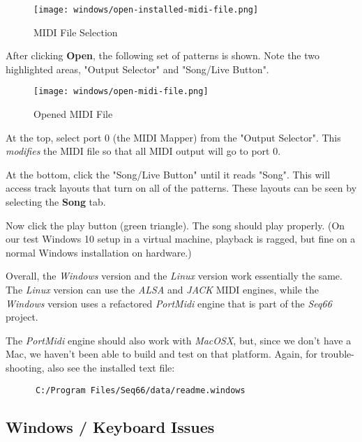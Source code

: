\begin{figure}[H]
   \centering 
   \texttt{[image: windows/open-installed-midi-file.png]}
   \caption{MIDI File Selection}
   \label{fig:windows_open_installed_midi_file}
\end{figure}

   After clicking \textbf{Open}, the following set of patterns is shown.
   Note the two highlighted areas, "Output Selector" and "Song/Live Button".

\begin{figure}[H]
   \centering 
   \texttt{[image: windows/open-midi-file.png]}
   \caption{Opened MIDI File}
   \label{fig:windows_open_midi_file}
\end{figure}

   At the top, select port 0 (the MIDI Mapper) from the "Output Selector".
   This \textsl{modifies} the MIDI file so that all MIDI
   output will go to port 0.

   At the bottom, click the "Song/Live Button" until it reads "Song".
   This will access track layouts that turn on all of the patterns.
   These layouts can be seen by selecting the \textbf{Song} tab.

   Now click the play button (green triangle).
   The song should play properly.
   (On our test Windows 10 setup in a virtual machine, playback is ragged,
   but fine on a normal Windows installation on hardware.)

   Overall, the \textsl{Windows} version and the \textsl{Linux} version
   work essentially the same. The \textsl{Linux} version can use the
   \textsl{ALSA} and \textsl{JACK} MIDI engines, while the \textsl{Windows}
   version uses a refactored \textsl{PortMidi} engine that is part of the
   \textsl{Seq66} project.

   The \textsl{PortMidi} engine should also work with \textsl{MacOSX}, but,
   since we don't have a Mac, we haven't been able to build and test
   on that platform.
   Again, for trouble-shooting, also see the installed text file:

   \begin{verbatim}
      C:/Program Files/Seq66/data/readme.windows
   \end{verbatim}

\subsection{Windows / Keyboard Issues}
\label{subsec:windows_keyboard_issues}

